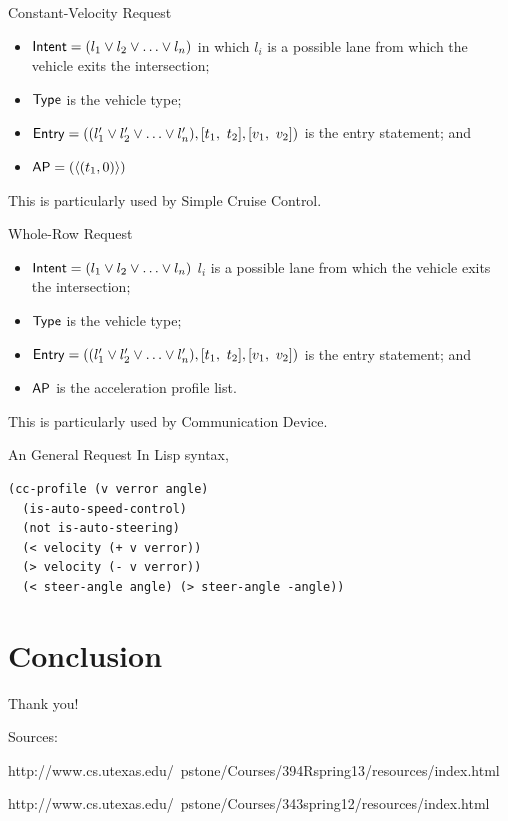 \documentclass{beamer}
\begin{document}
\begin{frame}{Constant-Velocity Request}
\begin{itemize}
\item ${\sf Intent} = ( l_1 \vee l_2 \vee \ldots \vee l_n )$
in which $l_i$ is a possible lane from which the vehicle 
exits the intersection;
\item ${\sf Type}$ is the vehicle type;
\item ${\sf Entry} = (( l'_1 \vee l'_2 \vee \ldots \vee l'_n ), [t_1,\ t_2], [v_1,\ v_2])$
is the entry statement; and
\item ${\sf AP} = ( \langle (t_1, 0) \rangle )$
\end{itemize}

This is particularly used by Simple Cruise Control.
\end{frame}

\begin{frame}{Whole-Row Request}
\begin{itemize}
\item ${\sf Intent} = ( l_1 \vee l_2 \vee \ldots \vee l_n )$ $l_i$ is a possible lane from which the vehicle exits the intersection;
\item ${\sf Type}$ is the vehicle type;
\item ${\sf Entry} = (( l'_1 \vee l'_2 \vee \ldots \vee l'_n ), [t_1,\ t_2], [v_1,\ v_2])$ is the entry statement; and
\item ${\sf AP}$ is the acceleration profile list.
\end{itemize}

This is particularly used by Communication Device.
\end{frame}

\begin{frame}[fragile]{An General Request}
In Lisp syntax,

\begin{small}
\begin{verbatim}
(cc-profile (v verror angle)
  (is-auto-speed-control)
  (not is-auto-steering)
  (< velocity (+ v verror))
  (> velocity (- v verror))
  (< steer-angle angle) (> steer-angle -angle))
\end{verbatim}
\end{small}
\end{frame}

\section{Conclusion}

\begin{frame}
\large{Thank you!}

\hfill
\hfill
\hfill

\tiny{Sources:

http://www.cs.utexas.edu/~pstone/Courses/394Rspring13/resources/index.html

http://www.cs.utexas.edu/~pstone/Courses/343spring12/resources/index.html}
\end{frame}
\end{document}

